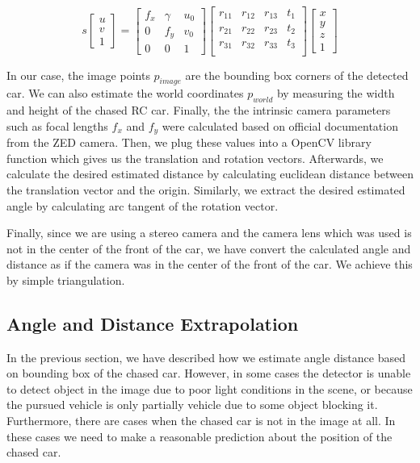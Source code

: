 \begin{equation}
s\begin{bmatrix}u\\v\\1\end{bmatrix} = \begin{bmatrix}
f_x & \gamma & u_0\\
0 & f_y & v_0\\
0 & 0 & 1
\end{bmatrix}\begin{bmatrix}
r_{11} & r_{12} & r_{13} & t_{1}\\
r_{21} & r_{22} & r_{23} & t_{2}\\
r_{31} & r_{32} & r_{33} & t_{3}\\
\end{bmatrix}
\begin{bmatrix}x\\y\\z\\1\end{bmatrix}
\end{equation}

In our case, the image points $p_{image}$ are the bounding box corners of the detected car. We can also estimate the world coordinates $p_{world}$ by measuring the width and height of the chased RC car. Finally, the the intrinsic camera parameters such as focal lengths $f_x$ and $f_y$ were calculated based on official documentation from the ZED camera. Then, we plug these values into a OpenCV \cite{opencv_library} library function which gives us the translation and rotation vectors. Afterwards, we calculate the desired estimated distance by calculating euclidean distance between the translation vector and the origin. Similarly, we extract the desired estimated angle by calculating arc tangent of the rotation vector. 

Finally, since we are using a stereo camera and the camera lens which was used is not in the center of the front of the car, we have convert the calculated angle and distance as if the camera was in the center of the front of the car. We achieve this by simple triangulation.

\subsection{Angle and Distance Extrapolation}
In the previous section, we have described how we estimate angle distance based on bounding box of the chased car. However, in some cases the detector is unable to detect object in the image due to poor light conditions in the scene, or because the pursued vehicle is only partially vehicle due to some object blocking it. Furthermore, there are cases when the chased car is not in the image at all. In these cases we need to make a reasonable prediction about the position of the chased car. \par


